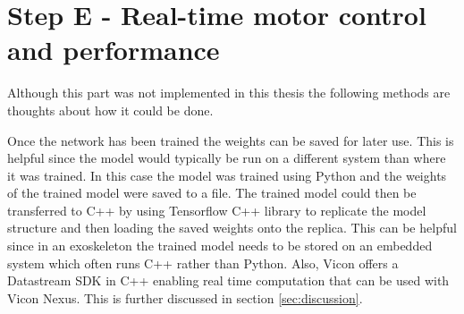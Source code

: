 \documentclass[../main.tex]{subfiles}
\begin{document}

\section{Step E - Real-time motor control and performance}
Although this part was not implemented in this thesis the following methods are thoughts about how it could be done.

Once the network has been trained the weights can be saved for later use.
This is helpful since the model would typically be run on a different system than where it was trained.
In this case the model was trained using Python and the weights of the trained model were saved to a file.
The trained model could then be transferred to C++ by using Tensorflow C++ library to replicate the model structure and then loading the saved weights onto the replica.
This can be helpful since in an exoskeleton the trained model needs to be stored on an embedded system which often runs C++ rather than Python.
Also, Vicon offers a Datastream SDK in C++ enabling real time computation that can be used with Vicon Nexus.
This is further discussed in section \ref{sec:discussion}.
\end{document}
